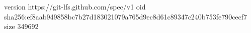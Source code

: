 version https://git-lfs.github.com/spec/v1
oid sha256:ef8aab949858bc7b27d183021079a765d9ec8d61c89347c240b753fe790cecf7
size 349692
